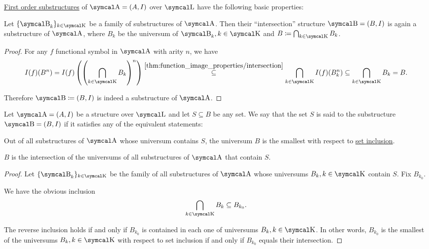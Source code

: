 \begin{proposition}\label{thm:first_order_substructure_properties}
  \hyperref[def:first_order_substructure]{First order substructures} of \( \CA = (A, I) \) over \( \CL \) have the following basic properties:
  \begin{PropEnum}
     Let \( \{ \CB_k \}_{k \in \CK} \) be a family of substructures of \( \CA \). Then their \enquote{intersection} structure \( \CB = (B, I) \) is again a substructure of \( \CA \), where \( B_k \) be the universum of \( \CB_k, k \in \CK \) and \( B \coloneqq \bigcap_{k \in \CK} B_k \).
  \end{PropEnum}
\end{proposition}
\begin{proof}
   For any \( f \) functional symbol in \( \CA \) with arity \( n \), we have
  \begin{equation*}
    I(f)(B^n) = I(f)\left(\left( \bigcap_{k \in \CK} B_k \right)^n \right) \overset {\ref{thm:function_image_properties/intersection}} \subseteq \bigcap_{k \in \CK} I(f)(B_k^n) \subseteq \bigcap_{k \in \CK} B_k = B.
  \end{equation*}

  Therefore \( \CB \coloneqq (B, I) \) is indeed a substructure of \( \CA \).
\end{proof}

\begin{definition}\label{def:first_order_generated_substructure}
  Let \( \CA = (A, I) \) be a structure over \( \CL \) and let \( S \subseteq B \) be any set. We say that the set \( S \) is said to  the substructure \( \CB = (B, I) \) if it satisfies any of the equivalent statements:
  \begin{ThmEnum}
     Out of all substructures of \( \CA \) whose universum contains \( S \), the universum \( B \) is the smallest with respect to \hyperref[def:subset]{set inclusion}.

     \( B \) is the intersection of the universums of all substructures of \( \CA \) that contain \( S \).
  \end{ThmEnum}
\end{definition}
\begin{proof}
  Let \( \{ \CB_k \}_{k \in \CK} \) be the family of all substructures of \( \CA \) whose universums \( B_k, k \in \CK \) contain \( S \). Fix \( B_{k_0} \).

  We have the obvious inclusion
  \begin{equation*}
    \bigcap_{k \in \CK} B_k \subseteq B_{k_0}.
  \end{equation*}

  The reverse inclusion holds if and only if \( B_{k_0} \) is contained in each one of universums \( B_k, k \in \CK \). In other words, \( B_{k_0} \) is the smallest of the universums \( B_k, k \in \CK \) with respect to set inclusion if and only if \( B_{k_0} \) equals their intersection.
\end{proof}

